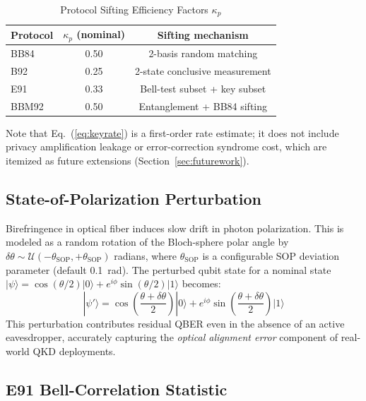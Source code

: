 \documentclass[journal]{IEEEtran}
\begin{document}
\begin{table}[!t]
  \caption{Protocol Sifting Efficiency Factors $\kappa_p$}
  \label{tab:kappa}
  \centering
  \footnotesize
  \begin{tabular}{lcc}
    \toprule
    Protocol & $\kappa_p$ (nominal) & Sifting mechanism \\
    \midrule
    BB84  & 0.50  & 2-basis random matching \\
    B92   & 0.25  & 2-state conclusive measurement \\
    E91   & 0.33  & Bell-test subset + key subset \\
    BBM92 & 0.50  & Entanglement + BB84 sifting \\
    \bottomrule
  \end{tabular}
\end{table}

Note that Eq.~(\ref{eq:keyrate}) is a first-order rate estimate;
it does not include privacy amplification leakage or error-correction
syndrome cost, which are itemized as future extensions
(Section~\ref{sec:futurework}).

\subsection{State-of-Polarization Perturbation}

Birefringence in optical fiber induces slow drift in photon polarization.
This is modeled as a random rotation of the Bloch-sphere polar angle by
$\delta\theta \sim \mathcal{U}(-\theta_{\mathrm{SOP}}, +\theta_{\mathrm{SOP}})$
radians, where $\theta_{\mathrm{SOP}}$ is a configurable SOP deviation
parameter (default 0.1~rad). The perturbed qubit state for a nominal
state $|\psi\rangle = \cos(\theta/2)|0\rangle + e^{i\phi}\sin(\theta/2)|1\rangle$
becomes:
\begin{equation}
  |\psi'\rangle = \cos\!\left(\frac{\theta+\delta\theta}{2}\right)|0\rangle
               + e^{i\phi}\sin\!\left(\frac{\theta+\delta\theta}{2}\right)|1\rangle
  \label{eq:sop}
\end{equation}
This perturbation contributes residual QBER even in the absence of
an active eavesdropper, accurately capturing the \emph{optical alignment
error} component of real-world QKD deployments.

\subsection{E91 Bell-Correlation Statistic}
\end{document}
